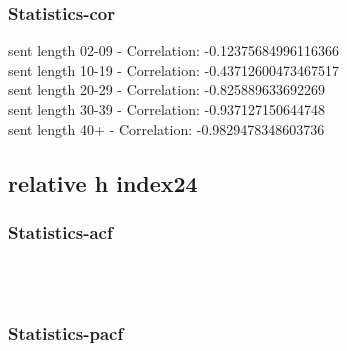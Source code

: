 \documentclass{article}%
\begin{document}
%
\newpage%
\subsubsection{Statistics{-}cor}%
\label{ssubsec:Statistics{-}cor}%
\noindent%
sent length 02-09 - Correlation: -0.12375684996116366\\%
sent length 10-19 - Correlation: -0.43712600473467517\\%
sent length 20-29 - Correlation: -0.825889633692269\\%
sent length 30-39 - Correlation: -0.937127150644748\\%
sent length 40+ - Correlation: -0.9829478348603736\\

%
\newpage

%
\subsection{relative h index24}%
\label{subsec:relativehindex24}%
\subsubsection{Statistics{-}acf}%
\label{ssubsec:Statistics{-}acf}%


\begin{figure}[ht]%
\centering%
\setlength{\abovecaptionskip}{-35pt}%
%
%
\\%
%
%
\\%
%
\end{figure}

%
\newpage%
\subsubsection{Statistics{-}pacf}%
\label{ssubsec:Statistics{-}pacf}%
\end{document}

